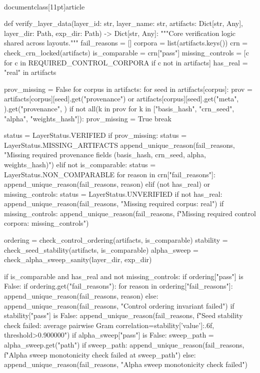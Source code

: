 \\documentclass[11pt]{article}
\begin{document}
\begin{CodeBlock}
def verify_layer_data(layer_id: str, layer_name: str, artifacts: Dict[str, Any], layer_dir: Path, exp_dir: Path) -> Dict[str, Any]:
    """Core verification logic shared across layouts."""
    fail_reasons = []
    corpora = list(artifacts.keys())
    crn = check_crn_locked(artifacts)
    is_comparable = crn["pass"]
    missing_controls = [c for c in REQUIRED_CONTROL_CORPORA if c not in artifacts]
    has_real = "real" in artifacts
    
    prov_missing = False
    for corpus in artifacts:
        for seed in artifacts[corpus]:
            prov = artifacts[corpus][seed].get("provenance") or artifacts[corpus][seed].get("meta", {}).get("provenance", {})
            if not all(k in prov for k in ["basis_hash", "crn_seed", "alpha", "weights_hash"]):
                prov_missing = True
                break
    
    status = LayerStatus.VERIFIED
    if prov_missing:
        status = LayerStatus.MISSING_ARTIFACTS
        append_unique_reason(fail_reasons, "Missing required provenance fields (basis_hash, crn_seed, alpha, weights_hash)")
    elif not is_comparable:
        status = LayerStatus.NON_COMPARABLE
        for reason in crn["fail_reasons"]:
            append_unique_reason(fail_reasons, reason)
    elif (not has_real) or missing_controls:
        status = LayerStatus.UNVERIFIED
        if not has_real:
            append_unique_reason(fail_reasons, "Missing required corpus: real")
        if missing_controls:
            append_unique_reason(fail_reasons, f"Missing required control corpora: {missing_controls}")
        
    ordering = check_control_ordering(artifacts, is_comparable)
    stability = check_seed_stability(artifacts, is_comparable)
    alpha_sweep = check_alpha_sweep_sanity(layer_dir, exp_dir)
    
    if is_comparable and has_real and not missing_controls:
        if ordering["pass"] is False:
            if ordering.get("fail_reasons"):
                for reason in ordering["fail_reasons"]:
                    append_unique_reason(fail_reasons, reason)
            else:
                append_unique_reason(fail_reasons, "Control ordering invariant failed")
        if stability["pass"] is False:
            append_unique_reason(fail_reasons, f"Seed stability check failed: average pairwise Gram correlation={stability['value']:.6f}, threshold>0.900000")
        if alpha_sweep["pass"] is False:
            sweep_path = alpha_sweep.get("path")
            if sweep_path:
                append_unique_reason(fail_reasons, f"Alpha sweep monotonicity check failed at {sweep_path}")
            else:
                append_unique_reason(fail_reasons, "Alpha sweep monotonicity check failed")
            

\end{CodeBlock}
\end{document}
